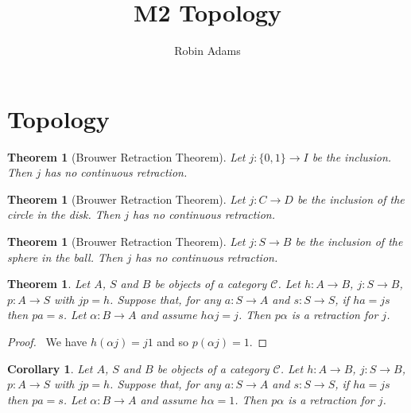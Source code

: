 \documentclass{article}
\title{M2 Topology}
\author{Robin Adams}
\let\qed\relax
\newtheorem{thm}[axiom]{Theorem}
\newtheorem{cor}{Corollary}[axiom]
\theoremstyle{definition}
\begin{document}
\maketitle
\tableofcontents

\section{Topology}


\begin{thm}[Brouwer Retraction Theorem]
    Let $j : \{0, 1\} \rightarrow I$ be the inclusion. Then $j$ has no continuous retraction.
\end{thm}

\begin{thm}[Brouwer Retraction Theorem]
    Let $j : C \rightarrow D$ be the inclusion of the circle in the disk. Then $j$ has no continuous retraction.
\end{thm}

\begin{thm}[Brouwer Retraction Theorem]
    Let $j : S \rightarrow B$ be the inclusion of the sphere in the ball. Then $j$ has no continuous retraction.
\end{thm}

\begin{thm}
    Let $A$, $S$ and $B$ be objects of a category $\mathcal{C}$. Let $h : A \rightarrow B$,
    $j : S \rightarrow B$, $p : A \rightarrow S$ with $jp = h$. Suppose that, for any $a : S \rightarrow A$ and
    $s : S \rightarrow S$, if $ha = js$ then $pa = s$. Let $\alpha : B \rightarrow A$ and assume
    $h \alpha j = j$. Then $p \alpha$ is a retraction for $j$.
\end{thm}

\begin{proof}
    \pf\ We have $h (\alpha j) = j 1$ and so $p (\alpha j) = 1$. \qed
\end{proof}

\begin{cor}
    Let $A$, $S$ and $B$ be objects of a category $\mathcal{C}$. Let $h : A \rightarrow B$,
    $j : S \rightarrow B$, $p : A \rightarrow S$ with $jp = h$. Suppose that, for any $a : S \rightarrow A$ and
    $s : S \rightarrow S$, if $ha = js$ then $pa = s$. Let $\alpha : B \rightarrow A$ and assume
    $h \alpha = 1$. Then $p \alpha$ is a retraction for $j$.
\end{cor}
\end{document}
